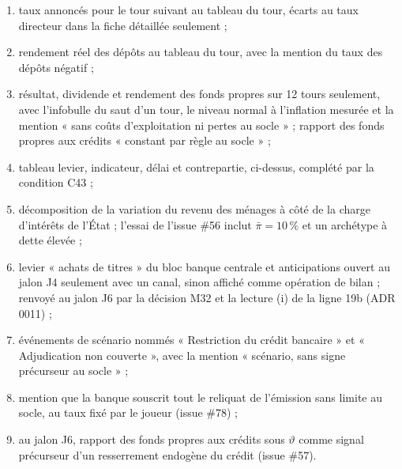 \documentclass[11pt,a4paper]{article}
\begin{document}
\begin{joueur}
\begin{enumerate}
\item taux annoncés pour le tour suivant au tableau du tour, écarts au taux directeur dans la fiche détaillée seulement ;
\item rendement réel des dépôts au tableau du tour, avec la mention du taux des dépôts négatif ;
\item résultat, dividende et rendement des fonds propres sur 12 tours seulement, avec l'infobulle du saut d'un tour, le niveau normal à l'inflation mesurée et la mention « sans coûts d'exploitation ni pertes au socle » ; rapport des fonds propres aux crédits « constant par règle au socle » ;
\item tableau levier, indicateur, délai et contrepartie, ci-dessus, complété par la condition C43 ;
\item décomposition de la variation du revenu des ménages à côté de la charge d'intérêts de l'État ; l'essai de l'issue \#56 inclut $\bar\pi = 10\,\%$ et un archétype à dette élevée ;
\item levier « achats de titres » du bloc banque centrale et anticipations ouvert au jalon J4 seulement avec un canal, sinon affiché comme opération de bilan ; renvoyé au jalon J6 par la décision M32 et la lecture (i) de la ligne 19b (ADR 0011) ;
\item événements de scénario nommés « Restriction du crédit bancaire » et « Adjudication non couverte », avec la mention « scénario, sans signe précurseur au socle » ;
\item mention que la banque souscrit tout le reliquat de l'émission sans limite au socle, au taux fixé par le joueur (issue \#78) ;
\item au jalon J6, rapport des fonds propres aux crédits sous $\vartheta$ comme signal précurseur d'un resserrement endogène du crédit (issue \#57).
\end{enumerate}
\end{joueur}
\end{document}
